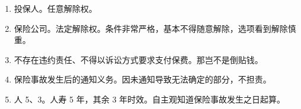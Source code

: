 \begin{enumerate}
\begin{enumerate}
          \item 保险人代签字。原则无效，投保人缴费 \yjt 积极行为 \yjt 视为追认。
          \item 合同审查期间事故的处理。就当事故没发生，本来该咋样咋样。
          \item 保险单、投保单不一致。冲突处理。
                \begin{enumerate}
                  \item 原则投保单 \dy 保险单。例外。说明 + 同意 \yjt 保险单。
                  \item 非格式 \dy 格式、手写 \dy 打印、在后 \dy 在前。
                \end{enumerate}
          \item 无效条款。排除或限制权利的条款。同民法。
        \end{enumerate}
  \item 投保人。任意解除权。
  \item 保险公司。法定解除权。条件非常严格，基本不得随意解除，选项看到解除慎重。
  \item 不存在违约责任、不得以诉讼方式要求支付保费。那岂不是倒贴钱。
  \item 保险事故发生后的通知义务。因未通知导致无法确定的部分，不担责。
  \item 人 5、3。人寿 5 年，其余 3 年时效。自主观知道保险事故发生之日起算。
\end{enumerate}

